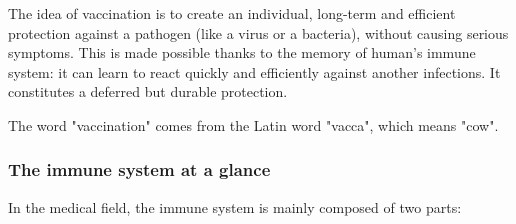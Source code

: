 \documentclass{article}
\begin{document}
            The idea of vaccination is to create an individual, long-term and efficient protection against a pathogen (like a virus or a bacteria), without causing serious symptoms.
            This is made possible thanks to the memory of human's immune system: it can learn to react quickly and efficiently against another infections.
            It constitutes a deferred but durable protection. 

            The word "vaccination" comes from the Latin word "vacca", which means "cow".

            \subsubsection*{The immune system at a glance}

                In the medical field, the immune system is mainly composed of two parts:
\end{document}
